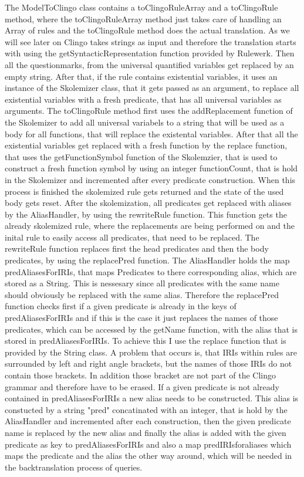 \documentclass[hyperref, bachelorofscience]{cgvpub}
\begin{document}
The ModelToClingo class contains a toClingoRuleArray and a toClingoRule method, where the toClingoRuleArray method just takes care of handling an Array of rules and the toClingoRule method does the actual translation. As we will see later on Clingo takes strings as input and therefore the translation starts with using the getSyntacticRepresentation function provided by Rulewerk. Then all the questionmarks, from the universal quantified variables get replaced by an empty string. After that, if the rule contains existential variables, it uses an instance of the Skolemizer class, that it gets passed as an argument, to replace all existential variables with a fresh predicate, that has all universal variables as arguments. The toClingoRule method first uses the addReplacement function of the Skolemizer to add all universal variabels to a string that will be used as a body for all functions, that will replace the existental variables. After that all the existential variables get replaced with a fresh function by the replace function, that uses the getFunctionSymbol function of the Skolemzier, that is used to construct a fresh function symbol by using an integer functionCount, that is hold in the Skolemizer and incremented after every predicate construction. When this process is finished the skolemized rule gets returned and the state of the used body gets reset. After the skolemization, all predicates get replaced with aliases by the AliasHandler, by using the rewriteRule function. This function gets the already skolemized rule, where the replacements are being performed on and the inital rule to easily access all predicates, that need to be replaced. The rewriteRule function replaces first the head predicates and then the body predicates, by using the replacePred function. The AliasHandler holds the map predAliasesForIRIs, that maps Predicates to there corresponding alias, which are stored as a String. This is nessesary since all predicates with the same name should obviously be replaced with the same alias. Therefore the replacePred function checks first if a given predicate is already in the keys of predAliasesForIRIs and if this is the case it just replaces the names of those predicates, which can be accessed by the getName function, with the alias that is stored in predAliasesForIRIs. To achieve this I use the replace function that is provided by the String class. A problem that occurs is, that IRIs within rules are surrounded by left and right angle brackets, but the names of those IRIs do not contain those brackets. In addition those bracket are not part of the Clingo grammar and therefore have to be erased. If a given predicate is not already contained in predAliasesForIRIs a new alias needs to be constructed. This alias is constucted by a string "pred" concatinated with an integer, that is hold by the AliasHandler and incremented after each construction, then the given predicate name is replaced by the new alias and finally the alias is added with the given predicate as key to predAliasesForIRIs and also a map predIRIsforaliases which maps the predicate and the alias the other way around, which will be needed in the backtranslation process of queries.\\
\end{document}
